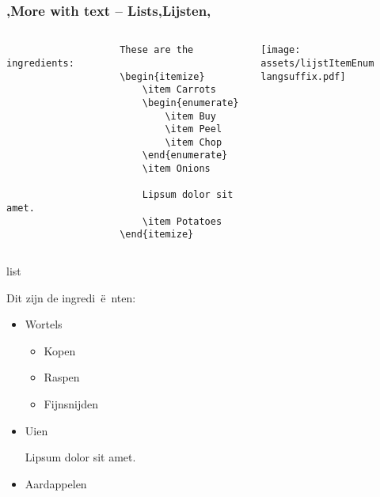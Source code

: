 \begin{frame}[fragile]
    \frametitle{\lang,More with text -- Lists,Lijsten,}
    
    \begin{columns}
        \begin{column}{0.5\textwidth}
            \begin{codebox}
                \begin{verbatim}
                    These are the ingredients:
                    \begin{itemize}
                        \item Carrots
                        \begin{enumerate}
                            \item Buy
                            \item Peel
                            \item Chop
                        \end{enumerate}
                        \item Onions
                        
                        Lipsum dolor sit amet.
                        \item Potatoes
                    \end{itemize}
                \end{verbatim}
            \end{codebox}
        \end{column}
        \begin{column}{0.5\textwidth}
            \texttt{[image: assets/lijstItemEnum\\langsuffix.pdf]}
        \end{column}
    \end{columns}
\end{frame}

    \begin{saveblock}{list}
        \begin{highlightblock}[linewidth=0.5\textwidth,gobble=8]
            Dit zijn de ingredi~\"e~nten:
            \begin{itemize}
                \item Wortels
                \begin{itemize}
                    \item Kopen
                    \item Raspen
                    \item Fijnsnijden
                \end{itemize}			
                \item Uien
                
                Lipsum dolor sit amet.
                \item Aardappelen
            \end{itemize}
        \end{highlightblock}
    \end{saveblock}

